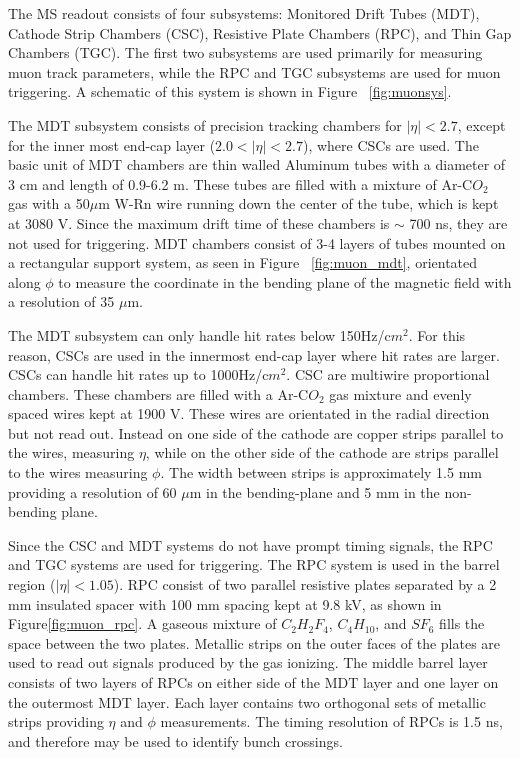 The MS readout consists of four subsystems: Monitored Drift Tubes (MDT), Cathode Strip Chambers (CSC), Resistive Plate Chambers (RPC), and Thin Gap Chambers (TGC). The first two subsystems are used primarily for measuring muon track parameters, while the RPC and TGC subsystems are used for muon triggering. A schematic of this system is shown in Figure ~\ref{fig:muonsys}. 

The MDT subsystem consists of precision tracking chambers for $|\eta|<2.7$, except for the inner most end-cap layer ($2.0 < |\eta| < 2.7$), where CSCs are used. The basic unit of MDT chambers are thin walled Aluminum tubes with a diameter of 3 cm and length of 0.9-6.2 m. These tubes are filled with a mixture of Ar-C$O_{2}$ gas with a  50$\mu$m W-Rn wire running down the center of the tube, which is kept at 3080 V. Since the maximum drift time of these chambers is $\sim$ 700 ns, they are not used for triggering. MDT chambers consist of 3-4 layers of tubes mounted on a rectangular support system, as seen in Figure ~\ref{fig:muon_mdt}, orientated along $\phi$ to measure the coordinate in the bending plane of the magnetic field with a resolution of 35 $\mu$m.

The MDT subsystem can only handle hit rates below 150Hz/c$m^{2}$. For this reason, CSCs are used in the innermost end-cap layer where hit rates are larger. CSCs can handle hit rates up to 1000Hz/c$m^{2}$. CSC are multiwire proportional chambers. These chambers are filled with a Ar-C$O_{2}$ gas mixture and evenly spaced wires kept at 1900 V. These wires are orientated in the radial direction but not read out. Instead on one side of the cathode are copper strips parallel to the wires, measuring $\eta$, while on the other side of the cathode are strips parallel to the wires measuring $\phi$. The width between strips is approximately 1.5 mm providing a resolution of 60 $\mu$m in the bending-plane and 5 mm in the non-bending plane. 

Since the CSC and MDT systems do not have prompt timing signals, the RPC and TGC systems are used for triggering. The RPC system is used in the barrel region ($|\eta| < 1.05$). RPC consist of two parallel resistive plates separated by a 2 mm insulated spacer with 100 mm spacing kept at 9.8 kV, as shown in Figure\ref{fig:muon_rpc}. A gaseous mixture of $C_{2}H_{2}F_{4}$, $C_{4}H_{10}$, and $SF_{6}$ fills the space between the two plates. Metallic strips on the outer faces of the plates are used to read out signals produced by the gas ionizing. The middle barrel layer consists of two layers of RPCs on either side of the MDT layer and one layer on the outermost MDT layer. Each layer contains two orthogonal sets of metallic strips providing $\eta$ and $\phi$ measurements. The timing resolution of RPCs is 1.5 ns, and therefore may be used to identify bunch crossings. 


